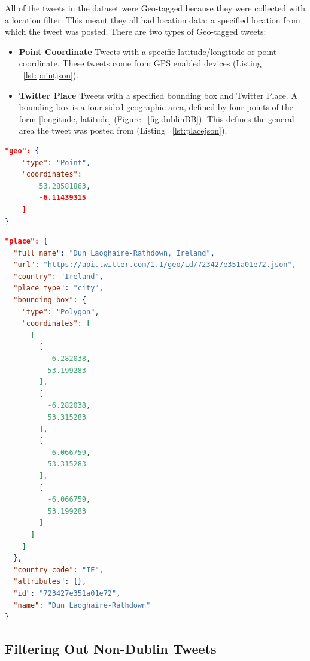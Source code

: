 All of the tweets in the dataset were Geo-tagged because they were collected with a location filter. This meant they all had location data: a specified location from which the tweet was posted. There are two types of Geo-tagged tweets:
\begin{itemize}
    \item \textbf{Point Coordinate}\newline
    Tweets with a specific latitude/longitude or point coordinate. These tweets come from GPS enabled devices (Listing ~\ref{lst:pointjson}).
    \item \textbf{Twitter Place}\newline
    Tweets with a specified bounding box and Twitter Place. A bounding box is a four-sided geographic area, defined by four points of the form [longitude, latitude] (Figure ~\ref{fig:dublinBB}). This defines the general area the tweet was posted from (Listing ~\ref{lst:placejson}). \newline
\end{itemize}

\begin{lstlisting}[caption={Geo-tagged Tweet with Point Coordinate},
captionpos=b,label=lst:pointjson,language=json,firstnumber=1]
"geo": {
    "type": "Point",
    "coordinates": 
        53.28581863,
        -6.11439315
    ]
}
\end{lstlisting}

\begin{lstlisting}[caption={Geo-tagged Tweet with Twitter Place},captionpos=b,label=lst:placejson,language=json,firstnumber=1]
"place": {
  "full_name": "Dun Laoghaire-Rathdown, Ireland",
  "url": "https://api.twitter.com/1.1/geo/id/723427e351a01e72.json",
  "country": "Ireland",
  "place_type": "city",
  "bounding_box": {
    "type": "Polygon",
    "coordinates": [
      [
        [
          -6.282038,
          53.199283
        ],
        [
          -6.282038,
          53.315283
        ],
        [
          -6.066759,
          53.315283
        ],
        [
          -6.066759,
          53.199283
        ]
      ]
    ]
  },
  "country_code": "IE",
  "attributes": {},
  "id": "723427e351a01e72",
  "name": "Dun Laoghaire-Rathdown"
}
\end{lstlisting}

\subsection{Filtering Out Non-Dublin Tweets}

